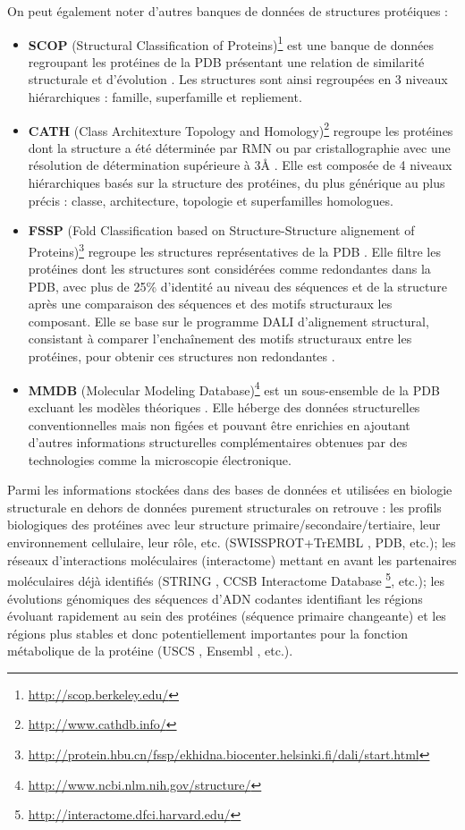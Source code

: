 On peut également noter d'autres banques de données de structures protéiques :
\begin{itemize}
  \item \textbf{SCOP} (Structural Classification of Proteins)\footnote{\url{http://scop.berkeley.edu/}} est une banque de données regroupant les protéines de la PDB présentant une relation de similarité structurale et d'évolution \cite{murzin1995scop}. Les structures sont ainsi regroupées en 3 niveaux hiérarchiques : famille, superfamille et repliement.
  \item \textbf{CATH} (Class Architexture Topology and Homology)\footnote{\url{http://www.cathdb.info/}} regroupe les protéines dont la structure a été déterminée par RMN ou par cristallographie avec une résolution de détermination supérieure à 3\r{A} \cite{sillitoe2015cath}. Elle est composée de 4 niveaux hiérarchiques basés sur la structure des protéines, du plus générique au plus précis : classe, architecture, topologie et superfamilles homologues.
  \item \textbf{FSSP} (Fold Classification based on Structure-Structure alignement of Proteins)\footnote{\url{http://protein.hbu.cn/fssp/ekhidna.biocenter.helsinki.fi/dali/start.html}} regroupe les structures représentatives de la PDB \cite{holm1996mapping}. Elle filtre les protéines dont les structures sont considérées comme redondantes dans la PDB, avec plus de 25\% d'identité au niveau des séquences et de la structure après une comparaison des séquences et des motifs structuraux les composant. Elle se base sur le programme DALI d'alignement structural, consistant à comparer l’enchaînement des motifs structuraux entre les protéines, pour obtenir ces structures non redondantes \cite{holm1998touring}.
  \item \textbf{MMDB} (Molecular Modeling Database)\footnote{\url{http://www.ncbi.nlm.nih.gov/structure/}} est un sous-ensemble de la PDB excluant les modèles théoriques \cite{madej2014mmdb}. Elle héberge des données structurelles conventionnelles mais non figées et pouvant être enrichies en ajoutant d'autres informations structurelles complémentaires obtenues par des technologies comme la microscopie électronique.
\end{itemize}

Parmi les informations stockées dans des bases de données et utilisées en biologie structurale en dehors de données purement structurales on retrouve : les profils biologiques des protéines avec leur structure primaire/secondaire/tertiaire, leur environnement cellulaire, leur rôle, etc. (SWISSPROT+TrEMBL \cite{boeckmann2003swiss}, PDB, etc.); les réseaux d'interactions moléculaires (interactome) mettant en avant les partenaires moléculaires déjà identifiés (STRING \cite{Snel15092000}, CCSB Interactome Database \footnote{\url{http://interactome.dfci.harvard.edu/}}, etc.); les évolutions génomiques des séquences d'ADN codantes identifiant les régions évoluant rapidement au sein des protéines (séquence primaire changeante) et les régions plus stables et donc potentiellement importantes pour la fonction métabolique de la protéine (USCS \cite{kent2002human}, Ensembl \cite{hubbard2002ensembl}, etc.). 


